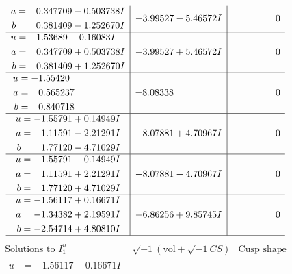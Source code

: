 \documentclass[1p]{elsarticle_modified}
\theoremstyle{definition}
\newcommand{\I}{\sqrt{-1}}
\begin{document}
$$\begin{array}{c|c|c}
\begin{aligned}
a &= \phantom{-}0.347709 - 0.503738 I \\
b &= \phantom{-}0.381409 - 1.252670 I\end{aligned}
 & -3.99527 - 5.46572 I & \phantom{-0.000000 } 0 \\ \hline\begin{aligned}
u &= \phantom{-}1.53689 - 0.16083 I \\
a &= \phantom{-}0.347709 + 0.503738 I \\
b &= \phantom{-}0.381409 + 1.252670 I\end{aligned}
 & -3.99527 + 5.46572 I & \phantom{-0.000000 } 0 \\ \hline\begin{aligned}
u &= -1.55420\phantom{ +0.000000I} \\
a &= \phantom{-}0.565237\phantom{ +0.000000I} \\
b &= \phantom{-}0.840718\phantom{ +0.000000I}\end{aligned}
 & -8.08338\phantom{ +0.000000I} & \phantom{-0.000000 } 0 \\ \hline\begin{aligned}
u &= -1.55791 + 0.14949 I \\
a &= \phantom{-}1.11591 - 2.21291 I \\
b &= \phantom{-}1.77120 - 4.71029 I\end{aligned}
 & -8.07881 + 4.70967 I & \phantom{-0.000000 } 0 \\ \hline\begin{aligned}
u &= -1.55791 - 0.14949 I \\
a &= \phantom{-}1.11591 + 2.21291 I \\
b &= \phantom{-}1.77120 + 4.71029 I\end{aligned}
 & -8.07881 - 4.70967 I & \phantom{-0.000000 } 0 \\ \hline\begin{aligned}
u &= -1.56117 + 0.16671 I \\
a &= -1.34382 + 2.19591 I \\
b &= -2.54714 + 4.80810 I\end{aligned}
 & -6.86256 + 9.85745 I & \phantom{-0.000000 } 0\\
 \hline 
 \end{array}$$\newpage$$\begin{array}{c|c|c}  
\text{Solutions to }I^u_{1}& \I (\text{vol} + \sqrt{-1}CS) & \text{Cusp shape}\\
 \hline 
\begin{aligned}
u &= -1.56117 - 0.16671 I \\

\end{aligned}
\end{array}$$
\end{document}

